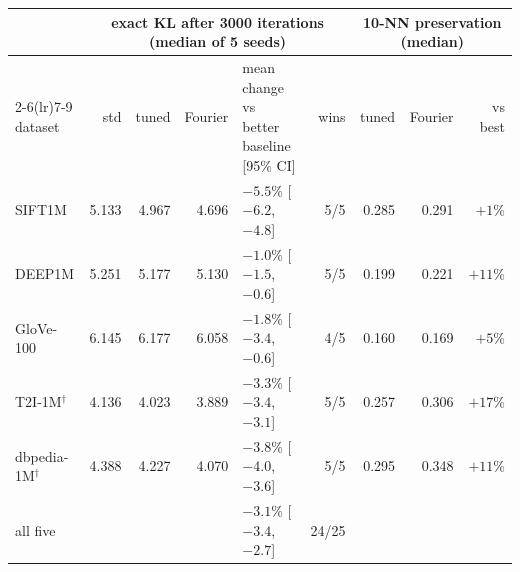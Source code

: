 \begin{tabular}{lrrrlrrrr}\toprule
 & \multicolumn{5}{c}{exact KL after 3000 iterations (median of 5 seeds)} & \multicolumn{3}{c}{10-NN preservation (median)}\\
\cmidrule(lr){2-6}\cmidrule(lr){7-9}
dataset & std & tuned & Fourier & mean change vs better baseline [95\% CI] & wins & tuned & Fourier & vs best\\\midrule
SIFT1M & 5.133 & 4.967 & 4.696 & $-5.5\%$ [$-6.2$, $-4.8$] & 5/5 & 0.285 & 0.291 & $+1\%$\\
DEEP1M & 5.251 & 5.177 & 5.130 & $-1.0\%$ [$-1.5$, $-0.6$] & 5/5 & 0.199 & 0.221 & $+11\%$\\
GloVe-100 & 6.145 & 6.177 & 6.058 & $-1.8\%$ [$-3.4$, $-0.6$] & 4/5 & 0.160 & 0.169 & $+5\%$\\
T2I-1M$^\dagger$ & 4.136 & 4.023 & 3.889 & $-3.3\%$ [$-3.4$, $-3.1$] & 5/5 & 0.257 & 0.306 & $+17\%$\\
dbpedia-1M$^\dagger$ & 4.388 & 4.227 & 4.070 & $-3.8\%$ [$-4.0$, $-3.6$] & 5/5 & 0.295 & 0.348 & $+11\%$\\
\midrule
all five & & & & $-3.1\%$ [$-3.4$, $-2.7$] & 24/25 & & & \\
\bottomrule\end{tabular}
